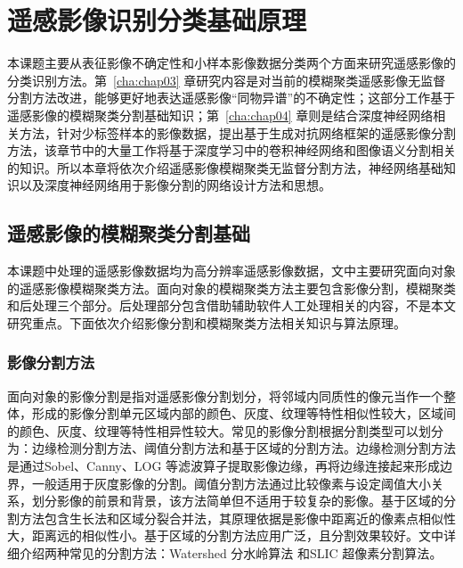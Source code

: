 
\chapter{遥感影像识别分类基础原理}
\label{cha:chap02}

本课题主要从表征影像不确定性和小样本影像数据分类两个方面来研究遥感影像的分类识别方法。第~\ref{cha:chap03} 章研究内容是对当前的模糊聚类遥感影像无监督分割方法改进，能够更好地表达遥感影像“同物异谱”的不确定性；这部分工作基于遥感影像的模糊聚类分割基础知识；第~\ref{cha:chap04} 章则是结合深度神经网络相关方法，针对少标签样本的影像数据，提出基于生成对抗网络框架的遥感影像分割方法，该章节中的大量工作将基于深度学习中的卷积神经网络和图像语义分割相关的知识。所以本章将依次介绍遥感影像模糊聚类无监督分割方法，神经网络基础知识以及深度神经网络用于影像分割的网络设计方法和思想。

\section{遥感影像的模糊聚类分割基础}
\label{sec:chap02-1}
本课题中处理的遥感影像数据均为高分辨率遥感影像数据，文中主要研究面向对象的遥感影像模糊聚类方法。面向对象的模糊聚类方法主要包含影像分割，模糊聚类和后处理三个部分。后处理部分包含借助辅助软件人工处理相关的内容，不是本文研究重点。下面依次介绍影像分割和模糊聚类方法相关知识与算法原理。

\subsection{影像分割方法}
\label{subsec:chap02-1-1}
面向对象的影像分割是指对遥感影像分割划分，将邻域内同质性的像元当作一个整体，形成的影像分割单元区域内部的颜色、灰度、纹理等特性相似性较大，区域间的颜色、灰度、纹理等特性相异性较大。常见的影像分割根据分割类型可以划分为：边缘检测分割方法、阈值分割方法和基于区域的分割方法。边缘检测分割方法是通过Sobel、Canny、LOG 等滤波算子提取影像边缘，再将边缘连接起来形成边界，一般适用于灰度影像的分割。阈值分割方法通过比较像素与设定阈值大小关系，划分影像的前景和背景，该方法简单但不适用于较复杂的影像。基于区域的分割方法包含生长法和区域分裂合并法，其原理依据是影像中距离近的像素点相似性大，距离远的相似性小。基于区域的分割方法应用广泛，且分割效果较好。文中详细介绍两种常见的分割方法：Watershed 分水岭算法\cite{vincent1991watersheds} 和SLIC 超像素分割算法\cite{achanta2012slic}。

